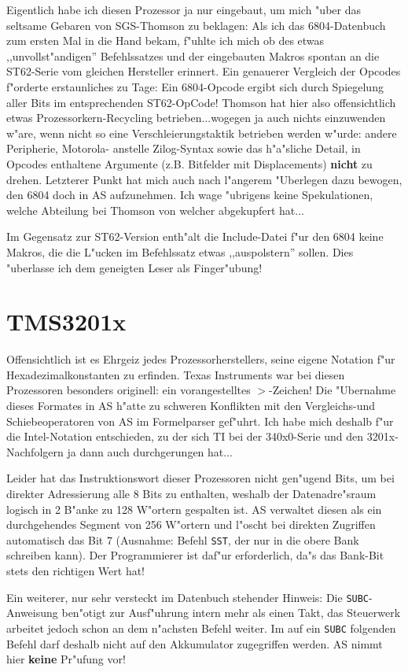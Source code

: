 \documentclass[12pt,a4paper,twoside]{report}
\newcommand{\bb}[1]{{\bf #1}}
\newcommand{\tty}[1]{{\tt #1}}
\begin{document}
{Eigentlich habe ich diesen Prozessor ja nur eingebaut, um mich "uber
das seltsame Gebaren von SGS-Thomson zu beklagen: Als ich das
6804-Datenbuch zum ersten Mal in die Hand bekam, f"uhlte ich mich ob des
etwas ,,unvollst"andigen'' Befehlssatzes und der eingebauten Makros
spontan an die ST62-Serie vom gleichen Hersteller erinnert.  Ein
genauerer Vergleich der Opcodes f"orderte erstaunliches zu Tage:
Ein 6804-Opcode ergibt sich durch Spiegelung aller Bits im entsprechenden
ST62-OpCode!  Thomson hat hier also offensichtlich etwas
Prozessorkern-Recycling betrieben...wogegen ja auch nichts einzuwenden
w"are, wenn nicht so eine Verschleierungstaktik betrieben werden w"urde:
andere Peripherie, Motorola- anstelle Zilog-Syntax sowie das h"a"sliche
Detail, in Opcodes enthaltene Argumente (z.B. Bitfelder mit Displacements)
\bb{nicht} zu drehen. Letzterer Punkt hat mich auch nach l"angerem "Uberlegen
dazu bewogen, den 6804 doch in AS aufzunehmen.  Ich wage "ubrigens keine
Spekulationen, welche Abteilung bei Thomson von welcher abgekupfert hat...
\par
Im Gegensatz zur ST62-Version enth"alt die Include-Datei f"ur den
6804 keine Makros, die die L"ucken im Befehlssatz etwas ,,auspolstern''
sollen.  Dies "uberlasse ich dem geneigten Leser als Finger"ubung!


\section{TMS3201x}

Offensichtlich ist es Ehrgeiz jedes Prozessorherstellers, seine eigene
Notation f"ur Hexadezimalkonstanten zu erfinden.  Texas Instruments
war bei diesen Prozessoren besonders originell: ein vorangestelltes
$>$-Zeichen!  Die "Ubernahme dieses Formates in AS h"atte zu schweren
Konflikten mit den Vergleichs-und Schiebeoperatoren von AS im Formelparser
gef"uhrt.  Ich habe mich deshalb f"ur die Intel-Notation entschieden, zu
der sich TI bei der 340x0-Serie und den 3201x-Nachfolgern ja dann auch
durchgerungen hat...
\par
Leider hat das Instruktionswort dieser Prozessoren nicht gen"ugend Bits,
um bei direkter Adressierung alle 8 Bits zu enthalten, weshalb der
Datenadre"sraum logisch in 2 B"anke zu 128 W"ortern gespalten ist.  AS
verwaltet diesen als ein durchgehendes Segment von 256 W"ortern und
l"oscht bei direkten Zugriffen automatisch das Bit 7 (Ausnahme: Befehl
\tty{SST}, der nur in die obere Bank schreiben kann). Der Programmierer
ist daf"ur erforderlich, da"s das Bank-Bit stets den richtigen Wert hat!
\par
Ein weiterer, nur sehr versteckt im Datenbuch stehender Hinweis: Die
\tty{SUBC}-Anweisung ben"otigt zur Ausf"uhrung intern mehr als einen
Takt, das Steuerwerk arbeitet jedoch schon an dem n"achsten Befehl weiter.
Im auf ein \tty{SUBC} folgenden Befehl darf deshalb nicht auf den
Akkumulator zugegriffen werden.  AS nimmt hier \bb{keine} Pr"ufung vor!

}
\end{document}

